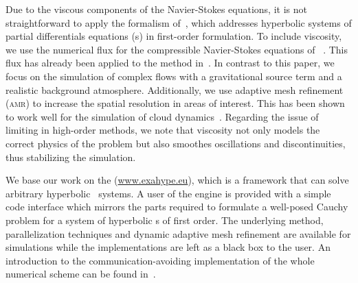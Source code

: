 \documentclass[runningheads]{llncs}
\begin{document}
Due to the viscous components of the Navier-Stokes equations, it is not straightforward to apply the \aderdg{} formalism of~\cite{dumbser2008unified}, which addresses hyperbolic systems of partial differentials equations (\pde{}s) in first-order formulation.
To include viscosity, we use the numerical flux for the compressible Navier-Stokes equations of \citeauthor{gassner2008discontinuous}~\cite{gassner2008discontinuous}.
This flux has already been applied to the \aderdg{} method in~\cite{dumbser2010arbitrary}.
In contrast to this paper, we focus on the simulation of complex flows with a gravitational source term and a realistic background atmosphere.
Additionally, we use adaptive mesh refinement (\textsc{amr}) to increase the spatial resolution in areas of interest.
This has been shown to work well for the simulation of cloud dynamics~\cite{muller2010adaptive}.
Regarding the issue of limiting in high-order \dg{} methods, we note that viscosity not only models the correct physics of the problem but also smoothes oscillations and discontinuities, thus stabilizing the simulation.

We base our work on the \exahypeengine{} (\url{www.exahype.eu}), which is a framework that can solve arbitrary hyperbolic \pde\ systems.
A user of the engine is provided with a simple code interface which mirrors the parts required to formulate a well-posed Cauchy problem for a system of hyperbolic \pde{}s of first order.
The underlying \aderdg{} method, parallelization techniques and dynamic adaptive mesh refinement are available for simulations while the implementations are left as a black box to the user.
An introduction to the communication-avoiding implementation of the whole numerical scheme can be found in~\cite{charrier2018stop}.%
\end{document}
